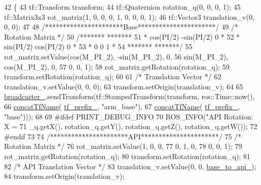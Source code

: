 \begin{DoxyCode}
42 \{
43     tf::Transform transform;
44     tf::Quaternion rotation\_q(0, 0, 0, 1);
45     tf::Matrix3x3 rot\_matrix(1, 0, 0, 0, 1, 0, 0, 0, 1);
46     tf::Vector3 translation\_v(0, 0, 0);
47 
48     \textcolor{comment}{/**********************Base**********************/}
49     \textcolor{comment}{/* Rotation Matrix */}
50     \textcolor{comment}{/*******               *******}
51 \textcolor{comment}{    * cos(PI/2)  -sin(PI/2)    0 *}
52 \textcolor{comment}{    * sin(PI/2)   cos(PI/2)    0 *}
53 \textcolor{comment}{    * 0              0         1 *}
54 \textcolor{comment}{    *******               *******/}
55     rot\_matrix.setValue(cos(M\_PI\_2), -sin(M\_PI\_2), 0,
56                         sin(M\_PI\_2), cos(M\_PI\_2), 0,
57                         0, 0, 1);
58     rot\_matrix.getRotation(rotation\_q);
59     transform.setRotation(rotation\_q);
60 
61     \textcolor{comment}{/* Translation Vector */}
62     translation\_v.setValue(0, 0, 0);
63     transform.setOrigin(translation\_v);
64 
65     \hyperlink{classjaco_1_1JacoKinematics_a3314f9e6a8fb86405384dd23bd194e46}{broadcaster\_}.sendTransform(tf::StampedTransform(transform, ros::Time::now(),
66                                                     \hyperlink{namespacejaco_a6320c11725be13d2957c4e3f474d62f8}{concatTfName}(
      \hyperlink{classjaco_1_1JacoKinematics_a0efb1f0ad1937553c7e285b27da0bdd3}{tf\_prefix\_}, \textcolor{stringliteral}{"arm\_base"}),
67                                                     \hyperlink{namespacejaco_a6320c11725be13d2957c4e3f474d62f8}{concatTfName}(
      \hyperlink{classjaco_1_1JacoKinematics_a0efb1f0ad1937553c7e285b27da0bdd3}{tf\_prefix\_}, \textcolor{stringliteral}{"base"})));
68 
69 \textcolor{preprocessor}{#ifdef PRINT\_DEBUG\_INFO}
70     ROS\_INFO(\textcolor{stringliteral}{"API Rotation: X = %
71              \_q.getX(), rotation\_q.getY(), rotation\_q.getZ(), rotation\_q.getW());
72 \textcolor{preprocessor}{#endif}
73 
74     \textcolor{comment}{/**********************API**********************/}
75     \textcolor{comment}{/* Rotation Matrix */}
76     rot\_matrix.setValue(1, 0, 0,
77                         0, 1, 0,
78                         0, 0, 1);
79     rot\_matrix.getRotation(rotation\_q);
80     transform.setRotation(rotation\_q);
81 
82     \textcolor{comment}{/* API Translation Vector */}
83     translation\_v.setValue(0, 0, \hyperlink{classjaco_1_1JacoKinematics_a4edc270c1506293993ed77f04409045c}{base\_to\_api\_});
84     transform.setOrigin(translation\_v);
}
\end{DoxyCode}
